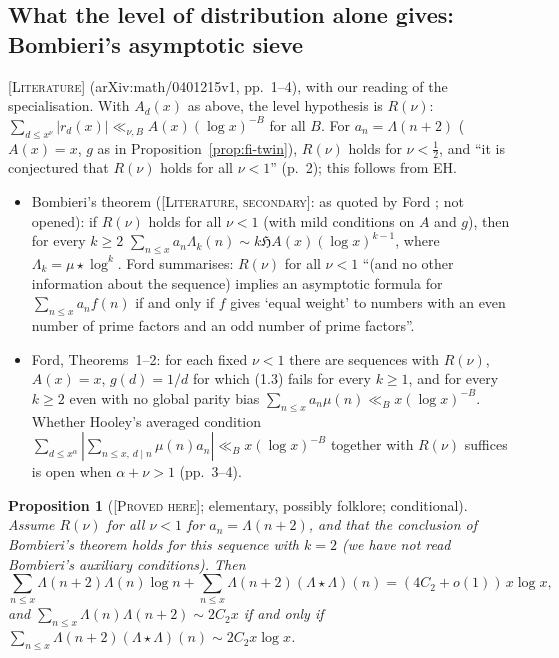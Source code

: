 \documentclass[11pt]{amsart}
\newtheorem{proposition}[theorem]{Proposition}
\theoremstyle{definition}
\theoremstyle{remark}
\newcommand{\lbl}[1]{\textup{\textsc{[#1]}}}
\begin{document}
\subsection{What the level of distribution alone gives: Bombieri's asymptotic sieve}\label{sec:bomb}
\lbl{Literature} \cite{Fo04} (arXiv:math/0401215v1, pp.~1--4), with our reading of the specialisation. With $A_d(x)$
as above, the level hypothesis is $R(\nu)$:
$\sum_{d\le x^\nu}|r_d(x)|\ll_{\nu,B}A(x)(\log x)^{-B}$ for all $B$. For
$a_n=\Lambda(n+2)$ ($A(x)=x$, $g$ as in Proposition~\ref{prop:fi-twin}),
$R(\nu)$ holds for $\nu<\frac12$, and ``it is conjectured that $R(\nu)$ holds
for all $\nu<1$'' (p.~2); this follows from EH.
\begin{itemize}
\item Bombieri's theorem (\lbl{Literature, secondary}: as quoted by Ford
  \cite[(1.3)]{Fo04}; \cite{Bo75,Bo76} not opened): if $R(\nu)$ holds for all
  $\nu<1$ (with mild conditions on $A$ and $g$), then for every $k\ge2$
  $\sum_{n\le x}a_n\Lambda_k(n)\sim k\mathfrak HA(x)(\log x)^{k-1}$, where
  $\Lambda_k=\mu\star\log^k$. Ford summarises: $R(\nu)$ for all $\nu<1$ ``(and no
  other information about the sequence) implies an asymptotic formula for
  $\sum_{n\le x}a_nf(n)$ if and only if $f$ gives `equal weight' to numbers with
  an even number of prime factors and an odd number of prime factors''.
\item Ford, Theorems~1--2: for each fixed $\nu<1$ there are sequences with
  $R(\nu)$, $A(x)=x$, $g(d)=1/d$ for which (1.3) fails for every $k\ge1$, and for
  every $k\ge2$ even with no global parity bias $\sum_{n\le x}a_n\mu(n)\ll_Bx(\log
  x)^{-B}$. Whether Hooley's averaged condition
  $\sum_{d\le x^\alpha}\left|\sum_{n\le x,\,d\mid n}\mu(n)a_n\right|\ll_Bx(\log x)^{-B}$
  together with $R(\nu)$ suffices is open when $\alpha+\nu>1$ (pp.~3--4).
\end{itemize}

\begin{proposition}[\lbl{Proved here}; elementary, possibly folklore; conditional]\label{prop:bomb-twin}
Assume $R(\nu)$ for all $\nu<1$ for $a_n=\Lambda(n+2)$, and that the conclusion
of Bombieri's theorem holds for this sequence with $k=2$ (we have not read
Bombieri's auxiliary conditions). Then
\[
\sum_{n\le x}\Lambda(n+2)\Lambda(n)\log n+\sum_{n\le x}\Lambda(n+2)(\Lambda\star\Lambda)(n)=(4C_2+o(1))\,x\log x,
\]
and $\sum_{n\le x}\Lambda(n)\Lambda(n+2)\sim2C_2x$ if and only if
$\sum_{n\le x}\Lambda(n+2)(\Lambda\star\Lambda)(n)\sim2C_2x\log x$.
\end{proposition}
\end{document}
